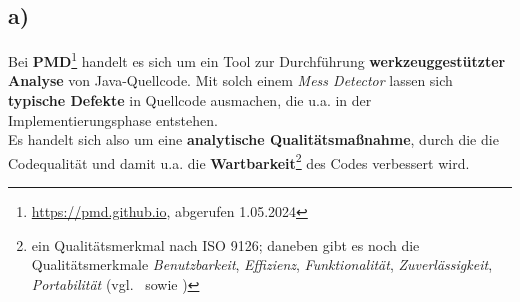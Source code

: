 \subsection*{a)}


Bei \textbf{PMD}\footnote{
    \url{https://pmd.github.io}, abgerufen 1.05.2024
} handelt es sich um ein Tool zur Durchführung \textbf{werkzeuggestützter Analyse} von Java-Quellcode.
Mit solch einem \textit{Mess Detector} lassen sich \textbf{typische Defekte} in Quellcode ausmachen, die u.a. in der Implementierungsphase entstehen.\\
Es handelt sich also um eine \textbf{analytische Qualitätsmaßnahme}, durch die die Codequalität und damit u.a. die \textbf{Wartbarkeit}\footnote{
ein Qualitätsmerkmal nach ISO 9126; daneben gibt es noch die Qualitätsmerkmale \textit{Benutzbarkeit}, \textit{Effizienz}, \textit{Funktionalität}, \textit{Zuverlässigkeit}, \textit{Portabilität} (vgl.~\cite[Abb. 1.2, 3]{Wed09c} sowie \cite[463 f.]{Bal08})
} des Codes verbessert wird.